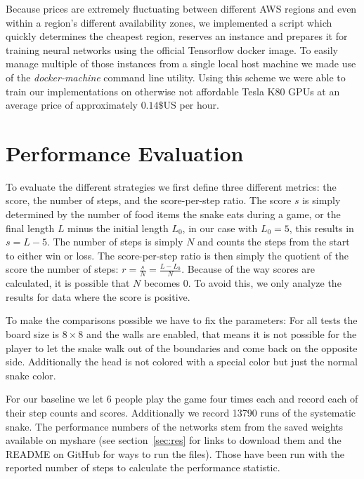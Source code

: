 \documentclass[a4paper]{article}
\begin{document}
Because prices are extremely fluctuating between different AWS regions and even within a region's different availability zones, we implemented a script which quickly determines the cheapest region, reserves an instance and prepares it for training neural networks using the official Tensorflow docker image. To easily manage multiple of those instances from a single local host machine we made use of the \textit{docker-machine} command line utility. Using this scheme we were able to train our implementations on otherwise not affordable Tesla K80 GPUs at an average price of approximately $0.14\$$US per hour.


\section{Performance Evaluation}
\label{sec:perf}
To evaluate the different strategies we first define three different metrics: the score, the number of steps, and the score-per-step ratio. The score $s$ is simply determined by the number of food items the snake eats during a game, or the final length $L$ minus the initial length $L_0$, in our case with $L_0 = 5$, this results in $s = L-5$. The number of steps is simply $N$ and counts the steps from the start to either win or loss. The score-per-step ratio is then simply the quotient of the score the number of steps: $r = \frac{s}{N} = \frac{L-L_0}{N}$. Because of the way scores are calculated, it is possible that $N$ becomes 0. To avoid this, we only analyze the results for data where the score is positive.

To make the comparisons possible we have to fix the parameters: For all tests the board size is $8 \times 8$ and the walls are enabled, that means it is not possible for the player to let the snake walk out of the boundaries and come back on the opposite side. Additionally the head is not colored with a special color but just the normal snake color.

For our baseline we let 6 people play the game four 
times each and record each of their step counts and scores. Additionally we  record 13790 runs of the systematic snake. The performance numbers of the networks stem from the saved weights available on myshare (see section~\ref{sec:res} for links to download them and the README on GitHub for ways to run the files). Those have been run with the reported number of steps to calculate the performance statistic.
\end{document}
